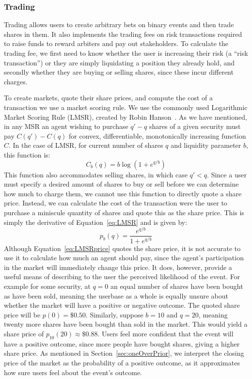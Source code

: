 \documentclass[10pt,a4paper]{article}
\theoremstyle{plain}
\theoremstyle{definition}
\begin{document}
\subsubsection{Trading}

Trading allows users to create arbitrary bets on binary events and then trade
shares in them. It also implements the trading fees on risk transactions
required to raise funds to reward arbiters and pay out stakeholders. To
calculate the trading fee, we first need to know whether the user is increasing
their risk (a ``risk transaction'') or they are simply liquidating a position
they already hold, and secondly whether they are buying or selling shares,
since these incur different charges.

To create markets, quote their share prices, and compute the cost of a
transaction we use a market scoring rule. We use the commonly used Logarithmic
Market Scoring Rule (LMSR), created by Robin Hanson~\cite{LMSR}. As we have
mentioned, in any MSR an agent wishing to purchase $q'-q$ shares of a given
security must pay $C(q')-C(q)$ for convex, differentiable, monotonically
increasing function $C$. In the case of LMSR, for current number of shares $q$
and liquidity parameter $b$, this function is:
%
\begin{equation}
	\label{eq:LMSR}
	C_b(q) = b \log (1 + e^{q/b})
\end{equation}
%
This function also accommodates selling shares, in which case $q'<q$.  Since a
user must specify a desired amount of shares to buy or sell before we can
determine how much to charge them, we cannot use this function to directly
quote a share price. Instead, we can calculate the cost of the transaction were
the user to purchase a miniscule quantity of shares and quote this as the share
price. This is simply the derivative of Equation~\ref{eq:LMSR} and is given by:
%
\begin{equation}
	\label{eq:LMSRprice}
	p_b(q) = \frac{ e^{q/b} }{ 1 + e^{q/b} }
\end{equation}
%
Although Equation~\ref{eq:LMSRprice} quotes the share price, it is not accurate
to use it to calculate how much an agent should pay, since the agent's
participation in the market will immediately change this price. It does,
however, provide a useful means of describing to the user the perceived
likelihood of the event. For example for some security, at $q=0$ an equal
number of shares have been bought as have been sold, meaning the userbase as a
whole is equally unsure about whether the market will have a positive or
negative outcome. The quoted share price will be $p(0)=\$0.50$.  Similarly,
suppose $b=10$ and $q=20$, meaning twenty more shares have been bought than
sold in the market. This would yield a share price of $p_{10}(20) \approx
\$0.88$. Users feel more confident that the event will have a positive outcome,
since more people have bought shares, giving a higher share price. As mentioned
in Section~\ref{sec:oneOverPrior}, we interpret the closing price of the market
as the probability of a positive outcome, as it approximates how sure users
feel about the event's outcome.
\end{document}
